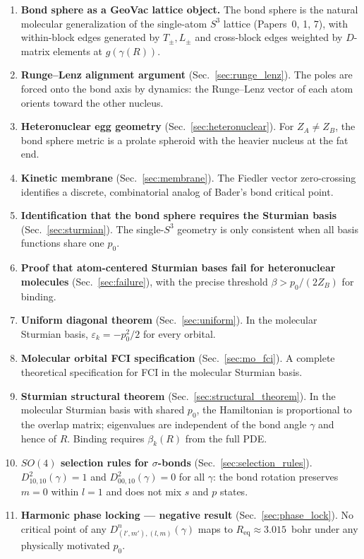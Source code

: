 \documentclass[aps,pra,twocolumn,superscriptaddress,longbibliography]{revtex4-2}
\begin{document}
\begin{enumerate}

\item \textbf{Bond sphere as a GeoVac lattice object.}  The bond
sphere is the natural molecular generalization of the single-atom
$S^3$ lattice (Papers~0, 1, 7), with within-block edges generated by
$T_\pm, L_\pm$ and cross-block edges weighted by $D$-matrix elements
at $g(\gamma(R))$.

\item \textbf{Runge--Lenz alignment argument}
(Sec.~\ref{sec:runge_lenz}).  The poles are forced onto the bond axis
by dynamics: the Runge--Lenz vector of each atom orients toward the
other nucleus.

\item \textbf{Heteronuclear egg geometry}
(Sec.~\ref{sec:heteronuclear}).  For $Z_A \neq Z_B$, the bond sphere
metric is a prolate spheroid with the heavier nucleus at the fat end.

\item \textbf{Kinetic membrane} (Sec.~\ref{sec:membrane}).  The
Fiedler vector zero-crossing identifies a discrete, combinatorial
analog of Bader's bond critical point.

\item \textbf{Identification that the bond sphere requires the
Sturmian basis} (Sec.~\ref{sec:sturmian}).  The single-$S^3$ geometry
is only consistent when all basis functions share one $p_0$.

\item \textbf{Proof that atom-centered Sturmian bases fail for
heteronuclear molecules} (Sec.~\ref{sec:failure}), with the precise
threshold $\beta > p_0/(2Z_B)$ for binding.

\item \textbf{Uniform diagonal theorem}
(Sec.~\ref{sec:uniform}).  In the molecular Sturmian basis,
$\varepsilon_k = -p_0^2/2$ for every orbital.

\item \textbf{Molecular orbital FCI specification}
(Sec.~\ref{sec:mo_fci}).  A complete theoretical specification for
FCI in the molecular Sturmian basis.

\item \textbf{Sturmian structural theorem}
(Sec.~\ref{sec:structural_theorem}).  In the molecular Sturmian basis
with shared $p_0$, the Hamiltonian is proportional to the overlap
matrix; eigenvalues are independent of the bond angle $\gamma$ and
hence of $R$.  Binding requires $\beta_k(R)$ from the full PDE.

\item \textbf{$SO(4)$ selection rules for $\sigma$-bonds}
(Sec.~\ref{sec:selection_rules}).
$D^2_{10,10}(\gamma) = 1$ and $D^2_{00,10}(\gamma) = 0$ for all
$\gamma$: the bond rotation preserves $m = 0$ within $l = 1$ and does
not mix $s$ and $p$ states.

\item \textbf{Harmonic phase locking --- negative result}
(Sec.~\ref{sec:phase_lock}).  No critical point of any
$D^n_{(l',m'),(l,m)}(\gamma)$ maps to $R_{\text{eq}} \approx 3.015$~bohr
under any physically motivated $p_0$.

\end{enumerate}
\end{document}
